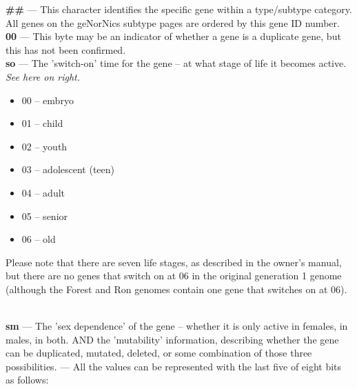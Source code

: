 \documentclass[11pt,twoside,a4paper]{article}
\begin{document}
\begin{minipage}[ht]{0.45\textwidth}
	\textbf{\#\#} --- This character identifies the specific gene within a type/subtype category. All genes on the geNorNics subtype pages are ordered by this gene ID number. ~\\
	
	\textbf{00} --- This byte may be an indicator of whether a gene is a duplicate gene, but this has not been confirmed. ~\\
	
	\textbf{so} --- The 'switch-on' time for the gene -- at what stage of life it becomes active. \emph{See here on right. }
\end{minipage} \hfill \begin{minipage}[ht]{0.45\textwidth}
	\begin{itemize}
		\item 00 -- embryo
		\item 01 -- child
		\item 02 -- youth
		\item 03 -- adolescent (teen)
		\item 04 -- adult
		\item 05 -- senior
		\item 06 -- old 
	\end{itemize} %
	
	Please note that there are seven life stages, as described in the owner's manual, but there are no genes that switch on at 06 in the original generation 1 genome (although the Forest and Ron genomes contain one gene that switches on at 06). ~\\
\end{minipage}

\textbf{sm} --- The 'sex dependence' of the gene -- whether it is only active in females, in males, in both. AND the 'mutability' information, describing whether the gene can be duplicated, mutated, deleted, or some combination of those three possibilities. --- All the values can be represented with the last five of eight bits as follows: ~\\
\end{document}
